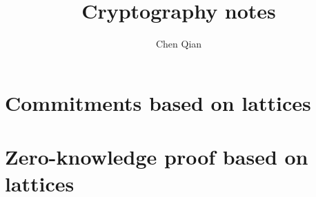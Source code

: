 \documentclass[10pt]{book}
\begin{document}
\pagestyle{plain}



\title{Cryptography notes}

\author{Chen Qian}


\maketitle

\tableofcontents

\chapter{Commitments based on lattices}


\chapter{Zero-knowledge proof based on lattices}



 
\end{document}
